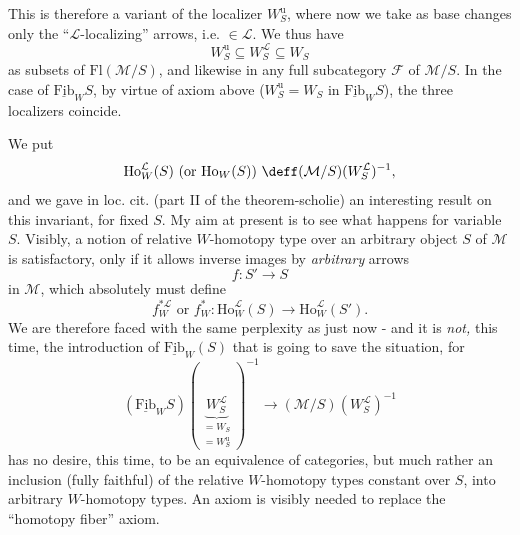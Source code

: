 
This is therefore a variant of the localizer $W^{\mathrm{u}}_S$, where now we take as base changes only the ``$\mathcal{L}$-localizing'' arrows, i.e. $\in \mathcal{L}$. We thus have
\[
W^{\mathrm{u}}_S \subseteq W^{\mathcal{L}}_S \subseteq W_S
\]
as subsets of $\mathrm{Fl}(\mathcal{M}/S)$, and likewise in any full subcategory $\mathcal{F}$ of $\mathcal{M}/S$. In the case of $\underline{\mathrm{Fib}}_W S$, by virtue of axiom  above ($W^{\mathrm{u}}_S = W_S$ in $\underline{\mathrm{Fib}}_W S$), the three localizers coincide.

We put
\[
\mathrm{Ho}^{\mathcal{L}}_W(S) \text{ (or } \mathrm{Ho}_W(S)\text{)} \ \deff (\mathcal{M}/S)(W^{\mathcal{L}}_S)^{-1},
\]
and we gave in loc. cit. (part II of the theorem-scholie) an interesting result on this invariant, for fixed $S$. My aim
at present is to see what happens for variable $S$. Visibly, a notion of relative $W$-homotopy type over an arbitrary object $S$ of $\mathcal{M}$ is satisfactory, only if it allows inverse images by \textit{arbitrary} arrows
\[
f : S' \longrightarrow S
\]
in $\mathcal{M}$, which absolutely must define
\[
f^{*\mathcal{L}}_W \text{ or } f^*_W : \mathrm{Ho}^{\mathcal{L}}_W(S) \longrightarrow \mathrm{Ho}^{\mathcal{L}}_W(S').
\]
We are therefore faced with the same perplexity as just now - and it is \textit{not,} this time, the introduction of $\underline{\mathrm{Fib}}_W(S)$ that is going to save the situation, for
\[
(\underline{\mathrm{Fib}}_W S)(\underbrace{W^{\mathcal{L}}_S}_{\substack{= W_S \\ = W^{\mathrm{u}}_S}})^{-1} \longrightarrow (\mathcal{M}/S)(W^{\mathcal{L}}_S)^{-1}
\]
has no desire, this time, to be an equivalence of categories, but much rather an inclusion (fully faithful) of the relative $W$-homotopy types constant over $S$, into arbitrary $W$-homotopy types. An axiom is visibly needed to replace the ``homotopy fiber'' axiom.


